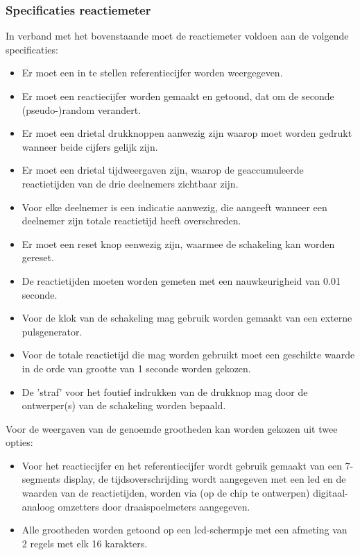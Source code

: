 \subsubsection{Specificaties reactiemeter}
In verband met het bovenstaande moet de reactiemeter voldoen aan de volgende
specificaties:
\begin{itemize}
\item Er moet een in te stellen referentiecijfer worden weergegeven.
\item Er moet een reactiecijfer worden gemaakt en getoond, dat om de
      seconde (pseudo-)random verandert.
\item Er moet een drietal drukknoppen aanwezig zijn waarop moet worden gedrukt
      wanneer beide cijfers gelijk zijn.
\item Er moet een drietal tijdweergaven zijn, waarop de geaccumuleerde
      reactietijden van de drie deelnemers zichtbaar zijn.
\item Voor elke deelnemer is een indicatie aanwezig, die aangeeft wanneer 
      een deelnemer zijn totale reactietijd heeft overschreden.
\item Er moet een reset knop eenwezig zijn, waarmee de schakeling kan worden 
      gereset.
\item De reactietijden moeten worden gemeten met een nauwkeurigheid
      van 0.01 seconde.
\item Voor de klok van de schakeling mag gebruik worden gemaakt van een
      externe pulsgenerator.
\item Voor de totale reactietijd die mag worden gebruikt moet een geschikte
      waarde in de orde van grootte van 1 seconde worden gekozen.
\item De 'straf' voor het foutief indrukken van de drukknop mag door de
      ontwerper(s) van de schakeling worden bepaald.
\end{itemize}
Voor de weergaven van de genoemde grootheden kan worden gekozen uit twee opties:
\begin{itemize}
\item Voor het reactiecijfer en het referentiecijfer wordt gebruik gemaakt
      van een 7-segments display, de tijdsoverschrijding wordt aangegeven 
      met een led en de waarden van de reactietijden, worden via (op de chip 
      te ontwerpen) digitaal-analoog omzetters door draaispoelmeters aangegeven.
\item Alle grootheden worden getoond op een lcd-schermpje met een afmeting
      van 2 regels met elk 16 karakters.
\end{itemize}

